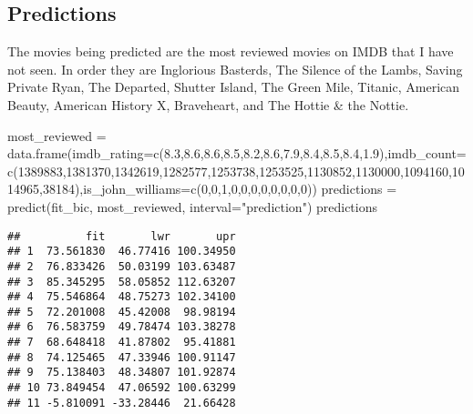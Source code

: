 \documentclass[
]{article}
\newenvironment{Shaded}{\begin{snugshade}}{\end{snugshade}}
\newcommand{\AttributeTok}[1]{\textcolor[rgb]{0.77,0.63,0.00}{#1}}
\newcommand{\DecValTok}[1]{\textcolor[rgb]{0.00,0.00,0.81}{#1}}
\newcommand{\FloatTok}[1]{\textcolor[rgb]{0.00,0.00,0.81}{#1}}
\newcommand{\FunctionTok}[1]{\textcolor[rgb]{0.00,0.00,0.00}{#1}}
\newcommand{\NormalTok}[1]{#1}
\newcommand{\OtherTok}[1]{\textcolor[rgb]{0.56,0.35,0.01}{#1}}
\newcommand{\StringTok}[1]{\textcolor[rgb]{0.31,0.60,0.02}{#1}}
\begin{document}
\hypertarget{predictions}{%
\subsection{Predictions}\label{predictions}}

The movies being predicted are the most reviewed movies on IMDB that I
have not seen. In order they are Inglorious Basterds, The Silence of the
Lambs, Saving Private Ryan, The Departed, Shutter Island, The Green
Mile, Titanic, American Beauty, American History X, Braveheart, and The
Hottie \& the Nottie.

\begin{Shaded}
\begin{Highlighting}[]
\NormalTok{most\_reviewed }\OtherTok{=} \FunctionTok{data.frame}\NormalTok{(}\AttributeTok{imdb\_rating=}\FunctionTok{c}\NormalTok{(}\FloatTok{8.3}\NormalTok{,}\FloatTok{8.6}\NormalTok{,}\FloatTok{8.6}\NormalTok{,}\FloatTok{8.5}\NormalTok{,}\FloatTok{8.2}\NormalTok{,}\FloatTok{8.6}\NormalTok{,}\FloatTok{7.9}\NormalTok{,}\FloatTok{8.4}\NormalTok{,}\FloatTok{8.5}\NormalTok{,}\FloatTok{8.4}\NormalTok{,}\FloatTok{1.9}\NormalTok{),}\AttributeTok{imdb\_count=}\FunctionTok{c}\NormalTok{(}\DecValTok{1389883}\NormalTok{,}\DecValTok{1381370}\NormalTok{,}\DecValTok{1342619}\NormalTok{,}\DecValTok{1282577}\NormalTok{,}\DecValTok{1253738}\NormalTok{,}\DecValTok{1253525}\NormalTok{,}\DecValTok{1130852}\NormalTok{,}\DecValTok{1130000}\NormalTok{,}\DecValTok{1094160}\NormalTok{,}\DecValTok{1014965}\NormalTok{,}\DecValTok{38184}\NormalTok{),}\AttributeTok{is\_john\_williams=}\FunctionTok{c}\NormalTok{(}\DecValTok{0}\NormalTok{,}\DecValTok{0}\NormalTok{,}\DecValTok{1}\NormalTok{,}\DecValTok{0}\NormalTok{,}\DecValTok{0}\NormalTok{,}\DecValTok{0}\NormalTok{,}\DecValTok{0}\NormalTok{,}\DecValTok{0}\NormalTok{,}\DecValTok{0}\NormalTok{,}\DecValTok{0}\NormalTok{,}\DecValTok{0}\NormalTok{))}
\NormalTok{predictions }\OtherTok{=} \FunctionTok{predict}\NormalTok{(fit\_bic, most\_reviewed, }\AttributeTok{interval=}\StringTok{"prediction"}\NormalTok{)}
\NormalTok{predictions}
\end{Highlighting}
\end{Shaded}

\begin{verbatim}
##          fit       lwr       upr
## 1  73.561830  46.77416 100.34950
## 2  76.833426  50.03199 103.63487
## 3  85.345295  58.05852 112.63207
## 4  75.546864  48.75273 102.34100
## 5  72.201008  45.42008  98.98194
## 6  76.583759  49.78474 103.38278
## 7  68.648418  41.87802  95.41881
## 8  74.125465  47.33946 100.91147
## 9  75.138403  48.34807 101.92874
## 10 73.849454  47.06592 100.63299
## 11 -5.810091 -33.28446  21.66428
\end{verbatim}
\end{document}
